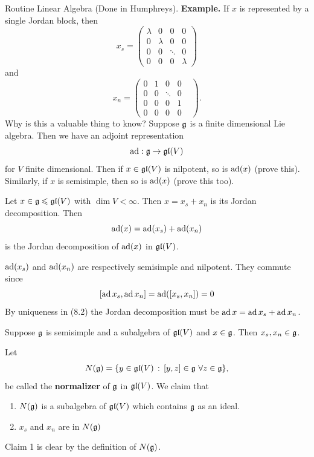 \documentclass{article}
\begin{document}
\proof Routine Linear Algebra (Done in Humphreys). \endproof
\textbf{Example. } If $x$ is represented by a single Jordan block, then \[ x_{s} = \begin{pmatrix}
    \lambda & 0 & 0 & 0\\
    0 & \lambda & 0 & 0\\
    0 & 0 & \ddots & 0\\
    0 & 0 & 0 & \lambda
\end{pmatrix} 
\] and \[ x_{n} = \begin{pmatrix}
    0 & 1 & 0 & 0 &\\
    0 & 0 & \ddots & 0\\
    0 & 0 & 0 & 1 &\\
    0 & 0 & 0 & 0
\end{pmatrix}.\]
Why is this a valuable thing to know? \gap Suppose $\mathfrak{g}$ is a finite dimensional Lie algebra. Then we have an adjoint representation \[ \operatorname{ad} : \mathfrak{g} \to \mathfrak{gl}(V)\] for $V$ finite dimensional. Then if $x \in \mathfrak{gl}(V)$ is nilpotent, so is $\operatorname{ad}(x)$ (prove this). Similarly, if $x$ is semisimple, then so is $\operatorname{ad}(x)$ (prove this too).
\begin{fancylem}{}
    Let $x \in \mathfrak{g} \leqslant \mathfrak{gl}(V)$ with $\dim V <\infty$. Then $x= x_{s} + x_{n}$ is its Jordan decomposition. Then \[\operatorname{ad}(x) = \operatorname{ad}(x_{s}) + \operatorname{ad}(x_{n})\] is the Jordan decomposition of $\operatorname{ad}(x)$ in $\mathfrak{gl}(V)$.
\end{fancylem}
\proof $\operatorname{ad}(x_{s})$ and $\operatorname{ad}(x_{n})$ are respectively semisimple and nilpotent. They commute since \[ [\operatorname{ad} x_{s}, \operatorname{ad} x_{n}] = \operatorname{ad}([x_{s},x_{n}]) = 0\] By uniqueness in (8.2) the Jordan decomposition must be $\operatorname{ad} x = \operatorname{ad} x_{s} + \operatorname{ad} x_{n}$. \endproof
\begin{fancythm}{}
    Suppose $\mathfrak{g}$ is semisimple and a subalgebra of $\mathfrak{gl}(V)$ and $x \in \mathfrak{g}$. Then $x_{s}, x_{n} \in \mathfrak{g}$.\\ \hspace{0.1cm}
\end{fancythm}
\proof Let \[N(\mathfrak{g}) = \{ y \in \mathfrak{gl}(V) \, : \, [y,z] \in \mathfrak{g} \, \, \forall z \in \mathfrak{g} \},\]
be called the \textbf{normalizer} of $\mathfrak{g}$ in $\mathfrak{gl}(V)$. We claim that \begin{enumerate}
    \item $N(\mathfrak{g})$ is a subalgebra of $\mathfrak{gl}(V)$ which contains $\mathfrak{g}$ as an ideal.
    \item $x_{s}$ and $x_{n}$ are in $N(\mathfrak{g})$
\end{enumerate}
Claim 1 is clear by the definition of $N(\mathfrak{g})$. \gap
\end{document}
